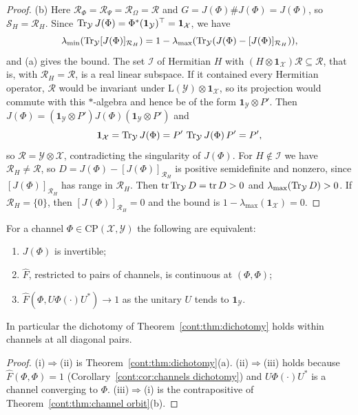 \begin{proof}
(b) Here $\mathcal{R}_\Phi=\mathcal{R}_\Psi=\mathcal{R}_\Omega=\mathcal{R}$ and $G=J(\Phi)\#J(\Phi)=J(\Phi)$, so $\mathcal{S}_H=\mathcal{R}_H$. Since $\operatorname{Tr}_{\mathcal{Y}}J(\Phi)=\Phi^*(\mathbf{1}_{\mathcal{Y}})^\top=\mathbf{1}_{\mathcal{X}}$, we have
\[
\lambda_{\min}(\operatorname{Tr}_{\mathcal{Y}}[J(\Phi)]_{\mathcal{R}_H})=1-\lambda_{\max}(\operatorname{Tr}_{\mathcal{Y}}(J(\Phi)-[J(\Phi)]_{\mathcal{R}_H})),
\]
and (a) gives the bound. The set $\mathcal{I}$ of Hermitian $H$ with $(H\otimes\mathbf{1}_{\mathcal{X}})\mathcal{R}\subseteq\mathcal{R}$, that is, with $\mathcal{R}_H=\mathcal{R}$, is a real linear subspace. If it contained every Hermitian operator, $\mathcal{R}$ would be invariant under $\mathrm{L}(\mathcal{Y})\otimes\mathbf{1}_{\mathcal{X}}$, so its projection would commute with this $*$-algebra and hence be of the form $\mathbf{1}_{\mathcal{Y}}\otimes P'$. Then $J(\Phi)=(\mathbf{1}_{\mathcal{Y}}\otimes P')J(\Phi)(\mathbf{1}_{\mathcal{Y}}\otimes P')$ and
\[
\mathbf{1}_{\mathcal{X}}=\operatorname{Tr}_{\mathcal{Y}}J(\Phi)=P'\,\operatorname{Tr}_{\mathcal{Y}}J(\Phi)\,P'=P',
\]
so $\mathcal{R}=\mathcal{Y}\otimes\mathcal{X}$, contradicting the singularity of $J(\Phi)$. For $H\notin\mathcal{I}$ we have $\mathcal{R}_H\neq\mathcal{R}$, so $D=J(\Phi)-[J(\Phi)]_{\mathcal{R}_H}$ is positive semidefinite and nonzero, since $[J(\Phi)]_{\mathcal{R}_H}$ has range in $\mathcal{R}_H$. Then $\operatorname{tr}\operatorname{Tr}_{\mathcal{Y}}D=\operatorname{tr} D>0$ and $\lambda_{\max}(\operatorname{Tr}_{\mathcal{Y}}D)>0$. If $\mathcal{R}_H=\{0\}$, then $[J(\Phi)]_{\mathcal{R}_H}=0$ and the bound is $1-\lambda_{\max}(\mathbf{1}_{\mathcal{X}})=0$.
\end{proof}

\begin{corollary}\label{cont:cor:diagonal channels}
For a channel $\Phi\in\mathrm{CP}(\mathcal{X},\mathcal{Y})$ the following are equivalent:
\begin{enumerate}
\item[(i)] $J(\Phi)$ is invertible;
\item[(ii)] $\widehat{F}$, restricted to pairs of channels, is continuous at $(\Phi,\Phi)$;
\item[(iii)] $\widehat{F}(\Phi,U\Phi(\cdot)U^*)\to1$ as the unitary $U$ tends to $\mathbf{1}_{\mathcal{Y}}$.
\end{enumerate}
In particular the dichotomy of Theorem~\ref{cont:thm:dichotomy} holds within channels at all diagonal pairs.
\end{corollary}

\begin{proof}
(i)$\Rightarrow$(ii) is Theorem~\ref{cont:thm:dichotomy}(a). (ii)$\Rightarrow$(iii) holds because $\widehat{F}(\Phi,\Phi)=1$ (Corollary~\ref{cont:cor:channels dichotomy}) and $U\Phi(\cdot)U^*$ is a channel converging to $\Phi$. (iii)$\Rightarrow$(i) is the contrapositive of Theorem~\ref{cont:thm:channel orbit}(b).
\end{proof}

